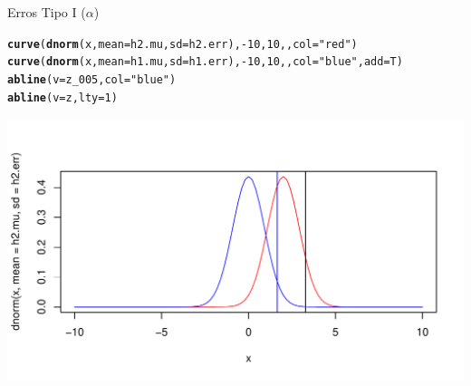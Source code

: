 \documentclass{beamer}\usepackage[]{graphicx}\usepackage[]{color}
\makeatletter
\def\maxwidth{ %
  \ifdim\Gin@nat@width>\linewidth
    \linewidth
  \else
    \Gin@nat@width
  \fi
}
\newcommand{\hlnum}[1]{\textcolor[rgb]{0.686,0.059,0.569}{#1}}%
\newcommand{\hlstr}[1]{\textcolor[rgb]{0.192,0.494,0.8}{#1}}%
\newcommand{\hlopt}[1]{\textcolor[rgb]{0,0,0}{#1}}%
\newcommand{\hlstd}[1]{\textcolor[rgb]{0.345,0.345,0.345}{#1}}%
\newcommand{\hlkwc}[1]{\textcolor[rgb]{0.333,0.667,0.333}{#1}}%
\newcommand{\hlkwd}[1]{\textcolor[rgb]{0.737,0.353,0.396}{\textbf{#1}}}%
\newenvironment{kframe}{%
 \def\at@end@of@kframe{}%
 \ifinner\ifhmode%
  \def\at@end@of@kframe{\end{minipage}}%
  \begin{minipage}{\columnwidth}%
 \fi\fi%
 \def\FrameCommand##1{\hskip\@totalleftmargin \hskip-\fboxsep
 \colorbox{shadecolor}{##1}\hskip-\fboxsep
     \hskip-\linewidth \hskip-\@totalleftmargin \hskip\columnwidth}%
 \MakeFramed {\advance\hsize-\width
   \@totalleftmargin\z@ \linewidth\hsize
   \@setminipage}}%
 {\par\unskip\endMakeFramed%
 \at@end@of@kframe}
\newenvironment{knitrout}{}{} %
\renewenvironment{knitrout}{\setlength{\topsep}{0mm}}{}
\makeatother
\begin{document}
\begin{frame}[fragile]{Erros Tipo I ($\alpha$)}

\begin{knitrout}\tiny
{}\color{fgcolor}\begin{kframe}
\begin{alltt}
\hlkwd{curve}\hlstd{(}\hlkwd{dnorm}\hlstd{(x,} \hlkwc{mean} \hlstd{= h2.mu,} \hlkwc{sd} \hlstd{= h2.err),} \hlopt{-}\hlnum{10}\hlstd{,} \hlnum{10}\hlstd{, ,} \hlkwc{col} \hlstd{=} \hlstr{"red"}\hlstd{)}
\hlkwd{curve}\hlstd{(}\hlkwd{dnorm}\hlstd{(x,} \hlkwc{mean} \hlstd{= h1.mu,} \hlkwc{sd} \hlstd{= h1.err),} \hlopt{-}\hlnum{10}\hlstd{,} \hlnum{10}\hlstd{, ,} \hlkwc{col} \hlstd{=} \hlstr{"blue"}\hlstd{,} \hlkwc{add} \hlstd{= T)}
\hlkwd{abline}\hlstd{(}\hlkwc{v} \hlstd{= z_005,} \hlkwc{col} \hlstd{=} \hlstr{"blue"}\hlstd{)}
\hlkwd{abline}\hlstd{(}\hlkwc{v} \hlstd{= z,} \hlkwc{lty} \hlstd{=} \hlnum{1}\hlstd{)}
\end{alltt}
\end{kframe}
\includegraphics[width=\maxwidth]{figure/erro_alfa_7-1} 

\end{knitrout}

\end{frame}
\end{document}
